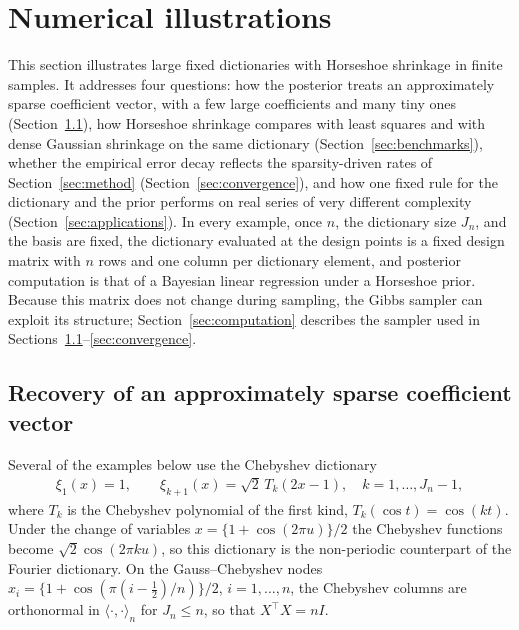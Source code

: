 \section{Numerical illustrations}\label{sec-verify}

This section illustrates large fixed dictionaries with Horseshoe shrinkage in finite samples. It addresses four questions: how the posterior treats an approximately sparse coefficient vector, with a few large coefficients and many tiny ones (Section~\ref{sec:recovery}), how Horseshoe shrinkage compares with least squares and with dense Gaussian shrinkage on the same dictionary (Section~\ref{sec:benchmarks}), whether the empirical error decay reflects the sparsity-driven rates of Section~\ref{sec:method} (Section~\ref{sec:convergence}), and how one fixed rule for the dictionary and the prior performs on real series of very different complexity (Section~\ref{sec:applications}). In every example, once $n$, the dictionary size $J_n$, and the basis are fixed, the dictionary evaluated at the design points is a fixed design matrix with $n$ rows and one column per dictionary element, and posterior computation is that of a Bayesian linear regression under a Horseshoe prior. Because this matrix does not change during sampling, the Gibbs sampler can exploit its structure; Section~\ref{sec:computation} describes the sampler used in Sections~\ref{sec:recovery}--\ref{sec:convergence}.

\subsection{Recovery of an approximately sparse coefficient vector}\label{sec:recovery}

Several of the examples below use the Chebyshev dictionary
\begin{align*}
\xi_1(x)=1,\qquad \xi_{k+1}(x)=\sqrt2\,T_k(2x-1),\quad k=1,\ldots,J_n-1,
\end{align*}
where $T_k$ is the Chebyshev polynomial of the first kind, $T_k(\cos t)=\cos(kt)$. Under the change of variables $x=\{1+\cos(2\pi u)\}/2$ the Chebyshev functions become $\sqrt2\cos(2\pi ku)$, so this dictionary is the non-periodic counterpart of the Fourier dictionary. On the Gauss--Chebyshev nodes $x_i=\{1+\cos(\pi(i-\tfrac12)/n)\}/2$, $i=1,\ldots,n$, the Chebyshev columns are orthonormal in $\langle\cdot,\cdot\rangle_n$ for $J_n\leq n$, so that $X^\top X=nI$.

